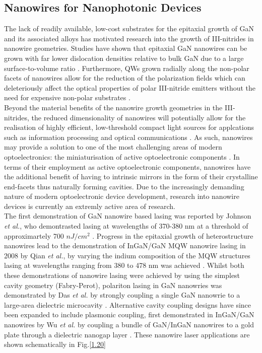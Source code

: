 \subsection{Nanowires for Nanophotonic Devices}
The lack of readily available, low-cost substrates for the epitaxial growth of GaN and its associated alloys has motivated research into the growth of III-nitrides in nanowire geometries. Studies have shown that epitaxial GaN nanowires can be grown with far lower dislocation densities relative to bulk GaN due to a large surface-to-volume ratio \cite{Bao2017}. Furthermore, QWs grown radially along the non-polar facets of nanowires allow for the reduction of the polarization fields which can deleteriously affect the optical properties of polar III-nitride emitters without the need for expensive non-polar substrates \cite{Bao2017}.\\
Beyond the material benefits of the nanowire growth geometries in the III-nitrides, the reduced dimensionality of nanowires will potentially allow for the realisation of highly efficient, low-threshold  compact light sources for applcations such as information processing and optical communications \cite{Arafin2013}. As such, nanowires may provide a solution to one of the most challenging areas of modern optoelectronics: the miniaturisation of active optoelectronic components \cite{Arafin2013}. In terms of their employment as active optoelectronic components, nanowires have the additional benefit of having to intrinsic mirrors in the form of their crystalline end-facets thus naturally forming cavities. Due to the increasingly demanding nature of modern optoelectronic device development, research into nanowire devices is currently an extremly active area of research.\\
The first demonstration of GaN nanowire based lasing was reported by Johnson {\it et al.}, who demontrasted lasing at wavelengths of 370-380 nm at a threshold of approximartely 700 $nJ/cm^2$ \cite{Johnson2002}. Progress in the epitaxial growth of heterostructure nanowires lead to the demonstration of InGaN/GaN MQW nanowire lasing in 2008 by Qian {\it et al.}, by varying the indium composition of the MQW structures lasing at wavelengths ranging from 380 to 478 nm was achieved \cite{Qian2008}. Whilst both these demonstrations of nanowire lasing were achieved by using the simplest cavity geometry (Fabry-Perot), polariton lasing in GaN nanowries was demonstrated by Das {\it et al.} by strongly coupling a single GaN nanowrie to a large-area dielectric microcavity \cite{Das2011}. Alternative cavity coupling designs have since been expanded to include plasmonic coupling, first demonstrated in InGaN/GaN nanowires by Wu {\it et al.} by coupling a bundle of GaN/InGaN nanowires to a gold plate through a dielectric nanogap layer \cite{Wu2011}. These nanowire laser applications are shown schematically in Fig.\ref{1.20}

